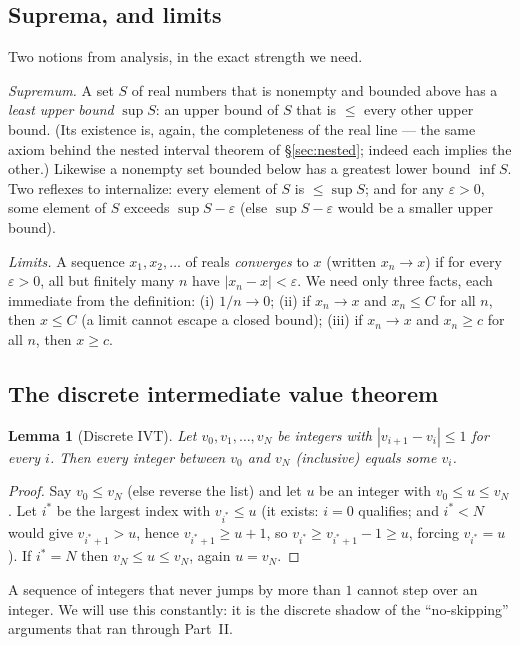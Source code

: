 \documentclass[11pt,reqno]{amsart}
\theoremstyle{plain}
\newtheorem{lemma}[theorem]{Lemma}
\theoremstyle{definition}
\theoremstyle{remark}
\begin{document}
\subsection{Suprema, and limits}

Two notions from analysis, in the exact strength we need.

\emph{Supremum.} A set $S$ of real numbers that is nonempty and bounded above has a
\emph{least upper bound} $\sup S$: an upper bound of $S$ that is $\le$ every other
upper bound. (Its existence is, again, the completeness of the real line --- the
same axiom behind the nested interval theorem of \S\ref{sec:nested}; indeed each
implies the other.) Likewise a nonempty set bounded below has a greatest lower
bound $\inf S$. Two reflexes to internalize: every element of $S$ is
$\le \sup S$; and for any $\varepsilon > 0$, some element of $S$ exceeds
$\sup S - \varepsilon$ (else $\sup S - \varepsilon$ would be a smaller upper bound).

\emph{Limits.} A sequence $x_1, x_2, \dots$ of reals \emph{converges} to $x$
(written $x_n \to x$) if for every $\varepsilon > 0$, all but finitely many $n$ have
$|x_n - x| < \varepsilon$. We need only three facts, each immediate from the
definition: (i) $1/n \to 0$; (ii) if $x_n \to x$ and $x_n \le C$ for all $n$, then
$x \le C$ (a limit cannot escape a closed bound); (iii) if $x_n \to x$ and $x_n \ge
c$ for all $n$, then $x \ge c$.

\subsection{The discrete intermediate value theorem}

\begin{lemma}[Discrete IVT]\label{lem:discrete-ivt}
Let $v_0, v_1, \dots, v_N$ be integers with $|v_{i+1} - v_i| \le 1$ for every $i$.
Then every integer between $v_0$ and $v_N$ (inclusive) equals some $v_i$.
\end{lemma}

\begin{proof}
Say $v_0 \le v_N$ (else reverse the list) and let $u$ be an integer with $v_0 \le u
\le v_N$. Let $i^*$ be the largest index with $v_{i^*} \le u$ (it exists: $i = 0$
qualifies; and $i^* < N$ would give $v_{i^*+1} > u$, hence $v_{i^*+1} \ge u + 1$, so
$v_{i^*} \ge v_{i^*+1} - 1 \ge u$, forcing $v_{i^*} = u$). If $i^* = N$ then
$v_N \le u \le v_N$, again $u = v_N$.
\end{proof}

A sequence of integers that never jumps by more than $1$ cannot step over an
integer. We will use this constantly: it is the discrete shadow of the
``no-skipping'' arguments that ran through Part~II.
\end{document}
